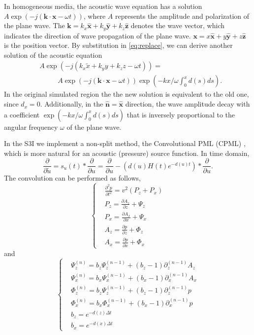 \documentclass[11pt,titlepage]{article}
\newcommand{\bx}{\boldsymbol{x}}
\newcommand{\bk}{\boldsymbol{k}}
\newcommand{\hx}{\hat{\mathbf{x}}}
\newcommand{\hy}{\hat{\mathbf{y}}}
\newcommand{\hz}{\hat{\mathbf{z}}}
\theoremstyle{plain}
\theoremstyle{definition}
\theoremstyle{remark}
\numberwithin{equation}{section}
\begin{document}
In homogeneous media, the acoustic wave equation has a solution $A \exp(-j (\bk \cdot \bx -\omega t))$, where $A$ represents the amplitude and polarization of the plane wave. The $\bk = k_x \hx + k_y \hy +k_z \hz$ denotes the wave vector, which 
indicates the direction of wave propagation of the plane wave. $\bx = x\hx +y\hy +z \hz$ is the position vector. By substitution  in \eqref{eq:replace}, we can derive another solution of the acoustic equation
\begin{equation}
\begin{aligned}
&A\exp(-j(k_x \tilde{x} + k_y y + k_z z -\omega t))=\\
 &~~~~~~~~~~~~A\exp(-j (\bk\cdot \bx -\omega t))\exp(-kx/\omega \int_0^x d(s)ds).
\end{aligned}
\end{equation}
In the original simulated region the the new solution is equivalent to the old one, since $d_x=0$. Additionally, in the $\hat{\mathbf{n}}= \hx$ direction, the wave amplitude decay with a coefficient $\exp(-kx/\omega \int_0^x d(s)ds)$ that is inversely proportional to the angular frequency $\omega$ of the plane wave. 

In the S3I we implement a non-split method, the Convolutional PML (CPML) \cite{Luebbers:1992aa, Roden:2000aa, Komatitsch:2007aa}, which is more natural for an acoustic (pressure) source function. In time domain,
 \begin{equation}
    \frac{\partial}{\partial \tilde{u}} = s_u(t) * \frac{\partial}{\partial u} = \frac{\partial}{\partial u} - \left(d(u)H(t)e^{-d(u)t}\right) * \frac{\partial}{\partial u}.
  \end{equation}
The convolution can be performed as follows,
  \begin{equation}
  \label{eq:fwdTimeCpml}
  \left\{
  \begin{aligned}
  &\frac{\partial^2 p}{\partial t^2}=v^2(P_z+P_x)\\
  &P_z=\frac{\partial A_z}{\partial z}+\Psi_z\\
  &P_x=\frac{\partial A_x}{\partial x}+\Psi_x\\
  &A_z=\frac{\partial p}{\partial z}+\Phi_z\\
  &A_x=\frac{\partial p}{\partial x}+\Phi_x
  \end{aligned}
  \right.
  \end{equation}
  and  
  \begin{equation}
  \label{eq:fwdTimeCpml_var}
  \left\{
  \begin{aligned}
  &\Psi_z^{(n)}=b_z\Psi_z^{(n-1)}+(b_z-1)\partial_z^{(n-1)}A_z\\
  &\Psi_x^{(n)}=b_x\Psi_x^{(n-1)}+(b_x-1)\partial_x^{(n-1)}A_x\\
  &\Phi_z^{(n)}=b_z\Psi_z^{(n-1)}+(b_z-1)\partial_z^{(n-1)}p\\
  &\Phi_x^{(n)}=b_x\Phi_x^{(n-1)}+(b_x-1)\partial_x^{(n-1)}p\\
  &b_z = e^{-d(z)\Delta t}\\
  &b_x = e^{-d(x)\Delta t}
  \end{aligned}
  \right.
  \end{equation}
\end{document}
